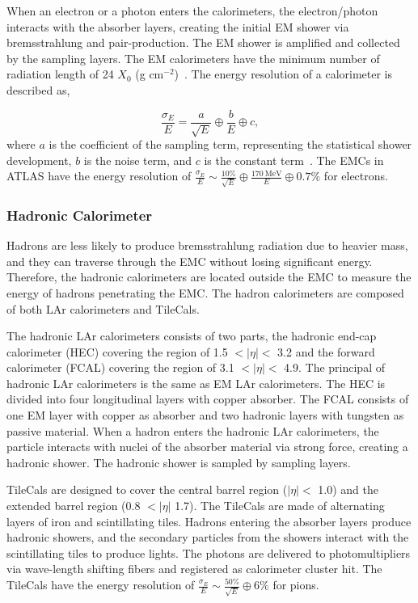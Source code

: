 When an electron or a photon enters the calorimeters, the electron/photon interacts with the absorber layers, creating the initial EM shower via bremsstrahlung and pair-production. The EM shower is amplified and collected by the sampling layers. The EM calorimeters have the minimum number of radiation length of 24 $X_{0}$ (g cm$^{-2}$)~\cite{ATLAS-LAR-CALORIMETER}. The energy resolution of a calorimeter is described as,

\begin{equation}
    \label{eq:calo_res}
    \frac{\sigma_{E}}{E} = \frac{a}{\sqrt{E}}\oplus\frac{b}{E}\oplus c,
\end{equation}
where $a$ is the coefficient of the sampling term, representing the statistical shower development, $b$ is the noise term, and $c$ is the constant term~\cite{1748-0221-9-09-C09007}. The EMCs in ATLAS have the energy resolution of $\frac{\sigma_{E}}{E} \sim \frac{10\%}{\sqrt{E}}\oplus\frac{170~\mathrm{MeV}}{E}\oplus 0.7\%$ for electrons.



\subsubsection{Hadronic Calorimeter}
\label{sec:atlas:Hcal}
Hadrons are less likely to produce bremsstrahlung radiation due to heavier mass, and they can traverse through the EMC without losing significant energy. Therefore, the hadronic calorimeters are located outside the EMC to measure the energy of hadrons penetrating the EMC. The hadron calorimeters are composed of both LAr calorimeters and TileCals.

The hadronic LAr calorimeters consists of two parts, the hadronic end-cap calorimeter (HEC) covering the region of 1.5 $<|\eta|<$ 3.2 and the forward calorimeter (FCAL) covering the region of 3.1 $<|\eta|<$ 4.9. The principal of hadronic LAr calorimeters is the same as EM LAr calorimeters. The HEC is divided into four longitudinal layers with copper absorber. The FCAL consists of one EM layer with copper as absorber and two hadronic layers with tungsten as passive material. When a hadron enters the hadronic LAr calorimeters, the particle interacts with nuclei of the absorber material via strong force, creating a hadronic shower. The hadronic shower is sampled by sampling layers.

 TileCals are designed to cover the central barrel region ($|\eta| <$ 1.0) and the extended barrel region (0.8 $<|\eta|$ 1.7). The TileCals are made of alternating layers of iron and scintillating tiles. Hadrons entering the absorber layers produce hadronic showers, and the secondary particles from the showers interact with the scintillating tiles to produce lights. The photons are delivered to photomultipliers via wave-length shifting fibers and registered as calorimeter cluster hit. The TileCals have the energy resolution of $\frac{\sigma_{E}}{E} \sim \frac{50\%}{\sqrt{E}}\oplus 6\%$ for pions.

